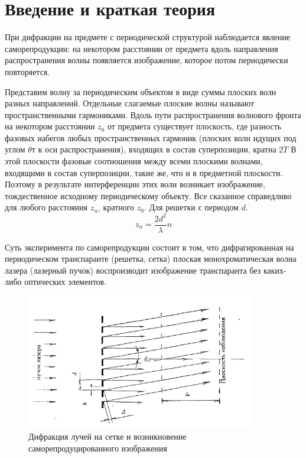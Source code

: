 \documentclass[15pt,a5paper,reqno]{article}
\begin{document}
\section{Введение и краткая теория}
При дифракции на предмете с периодической структурой наблюдается явление саморепродукции: на некотором расстоянии от предмета вдоль направления распространения волны появляется изображение, которое потом периодически повторяется.  \par
Представим волну за периодическим объектом в виде суммы плоских волн разных направлений. Отдельные слагаемые плоские волны называют пространственными гармониками. Вдоль пути распространения волнового фронта на некотором расстоянии $z_0$ от предмета существует плоскость, где разность фазовых набегов любых пространственных гармоник (плоских волн идущих под углом $\theta$т к оси распространения), входящих в состав суперпозиции, кратна $2T$ В этой плоскости фазовые соотношения между всеми плоскими волнами, входящими в состав суперпозиции, такие же, что и в предметной плоскости. Поэтому в результате интерференции этих волн возникает изображение, тождественное исходному периодическому объекту. Все сказанное справедливо для любого расстояния $z_n$, кратного $z_0$. Для решетки с периодом $d$.
\begin{equation}
    z_n = \frac{2d^2}{\lambda}n
\end{equation}

Суть эксперимента по саморепродукции состоит в том, что дифрагированная на периодическом транспаранте (решетка, сетка) плоская монохроматическая волна лазера (лазерный пучок) воспроизводит изображение транспаранта без каких-либо оптических элементов.

\begin{figure}[h!]
    \centering
    \includegraphics[width=10cm]{pics/fig1.png}
    \caption{Дифракция лучей на сетке и возникновение саморепродуцированного изображения}
    \label{fig:vac}
\end{figure}
\end{document}
